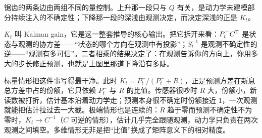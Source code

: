 锯齿的两条边由两组不同的量控制。上升那一段只与 \(Q\) 有关，是动力学未建模部分持续注入的不确定性；下降那一段的深浅由观测决定，而决定深浅的正是 \(K_t\)。

\(K_t\) 叫 Kalman gain，它是这一整套推导的核心输出。把它拆开来看：\(P_t^- C^{\mathsf{T}}\) 是状态与观测的协方差——``状态的哪个方向在观测中有投影''；\(S_t^{-1}\) 是观测不确定性的逆——``观测有多可信''。二者相乘的结果决定了：在观测告诉你的方向上，你用多大的步长修正预测，也就是上图里那道下降沿有多陡。

标量情形把这件事写得最干净。此时 \(K_t = P_t^-/(P_t^- + R)\)，正是预测方差在新息总方差中占的份额，它只依赖 \(P_t^-\) 与 \(R\) 的比值。传感器很吵时 \(R\) 大，份额小，新读数被打折，估计基本沿着动力学走；预测本身很不确定时份额接近 1，一次观测就能把估计拉过去一大截。极端情形也是连续的：\(R\) 趋于零而预测不确定性不为零时，\(K_t \to C^{-1}\)（\(C\) 可逆的情形），估计几乎完全跟随观测，动力学只负责在两次观测之间填空。多维情形无非是把``比值''换成了矩阵意义下的相对精度。


